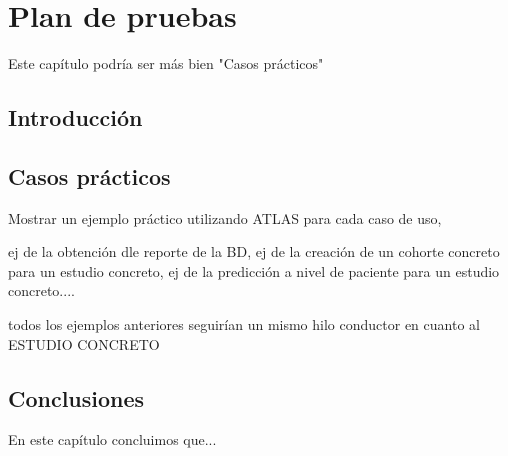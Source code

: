 \chapter{Plan de pruebas}\label{cap:pruebas}

Este capítulo podría ser más bien "Casos prácticos"

\section{Introducción}

\section{Casos prácticos}


Mostrar un ejemplo práctico utilizando ATLAS para cada caso de uso,

ej de la obtención dle reporte de la BD,
ej de la creación de un cohorte concreto para un estudio concreto,
ej de la predicción a nivel de paciente para un estudio concreto....

todos los ejemplos anteriores seguirían un mismo hilo conductor en cuanto al ESTUDIO CONCRETO

\section{Conclusiones}

En este capítulo concluimos que...